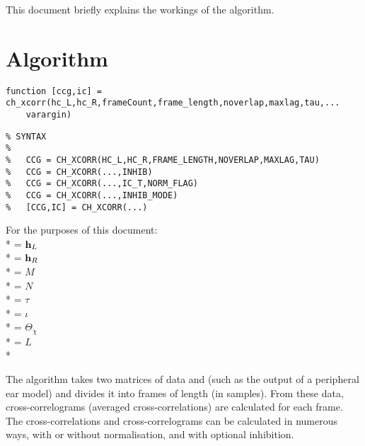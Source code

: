 \documentclass[10pt]{article}
\begin{document}
{\sf\maketitle}

This document briefly explains the workings of the  algorithm.

\section*{Algorithm}


\begin{lstlisting}
function [ccg,ic] = ch_xcorr(hc_L,hc_R,frameCount,frame_length,noverlap,maxlag,tau,...
    varargin)
\end{lstlisting}

\begin{lstlisting}
% SYNTAX
%   
%   CCG = CH_XCORR(HC_L,HC_R,FRAME_LENGTH,NOVERLAP,MAXLAG,TAU)
%   CCG = CH_XCORR(...,INHIB)
%   CCG = CH_XCORR(...,IC_T,NORM_FLAG)
%   CCG = CH_XCORR(...,INHIB_MODE)
%   [CCG,IC] = CH_XCORR(...)
\end{lstlisting}

For the purposes of this document:\\*
 = $\mathbf{h}_L$\\*
 = $\mathbf{h}_R$\\*
 = $M$\\*
 = $N$\\*
 = $\tau$\\*
 = $\iota$\\*
 = $\Theta_\chi$\\*
 = $L$\\*

The algorithm takes two matrices of data  and  (such as the output of a peripheral ear model) and divides it into frames of length  (in samples). From these data, cross-correlograms (averaged cross-correlations) are calculated for each frame. The cross-correlations and cross-correlograms can be calculated in numerous ways, with or without normalisation, and with optional inhibition.
\end{document}

